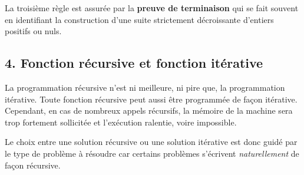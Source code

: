 \documentclass[
  a4paper,
  DIV=11,
  numbers=noendperiod]{scrartcl}
\begin{document}
La troisième règle est assurée par la \textbf{preuve de terminaison} qui
se fait souvent en identifiant la construction d'une suite strictement
décroissante d'entiers positifs ou nuls.

\hypertarget{fonction-ruxe9cursive-et-fonction-ituxe9rative}{%
\subsection{4. Fonction récursive et fonction
itérative}\label{fonction-ruxe9cursive-et-fonction-ituxe9rative}}

La programmation récursive n'est ni meilleure, ni pire que, la
programmation itérative. Toute fonction récursive peut aussi être
programmée de façon itérative. Cependant, en cas de nombreux appels
récursifs, la mémoire de la machine sera trop fortement sollicitée et
l'exécution ralentie, voire impossible.

Le choix entre une solution récursive ou une solution itérative est donc
guidé par le type de problème à résoudre car certains problèmes
s'écrivent \emph{naturellement} de façon récursive.
\end{document}
